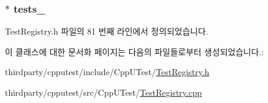 \subsubsection[{\texorpdfstring{tests\+\_\+}{tests_}}]{$\ast$ tests\+\_\+\hspace{0.3cm}{\ttfamily [private]}}\hypertarget{class_test_registry_ac25160ebe0919f203197a4c65a72b02e}{}\label{class_test_registry_ac25160ebe0919f203197a4c65a72b02e}


Test\+Registry.\+h 파일의 81 번째 라인에서 정의되었습니다.



이 클래스에 대한 문서화 페이지는 다음의 파일들로부터 생성되었습니다.\+:\begin{DoxyCompactItemize}
\item 
thirdparty/cpputest/include/\+Cpp\+U\+Test/\hyperlink{_test_registry_8h}{Test\+Registry.\+h}\item 
thirdparty/cpputest/src/\+Cpp\+U\+Test/\hyperlink{_test_registry_8cpp}{Test\+Registry.\+cpp}\end{DoxyCompactItemize}
